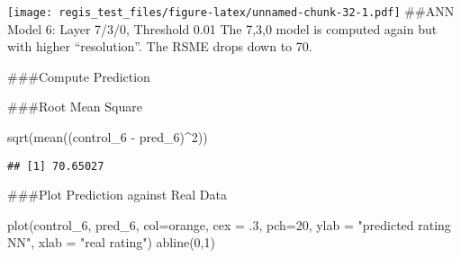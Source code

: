 \documentclass[
]{article}
\newenvironment{Shaded}{\begin{snugshade}}{\end{snugshade}}
\newcommand{\AttributeTok}[1]{\textcolor[rgb]{0.77,0.63,0.00}{#1}}
\newcommand{\DecValTok}[1]{\textcolor[rgb]{0.00,0.00,0.81}{#1}}
\newcommand{\FunctionTok}[1]{\textcolor[rgb]{0.00,0.00,0.00}{#1}}
\newcommand{\NormalTok}[1]{#1}
\newcommand{\OtherTok}[1]{\textcolor[rgb]{0.56,0.35,0.01}{#1}}
\newcommand{\SpecialCharTok}[1]{\textcolor[rgb]{0.00,0.00,0.00}{#1}}
\newcommand{\StringTok}[1]{\textcolor[rgb]{0.31,0.60,0.02}{#1}}
\begin{document}
\texttt{[image: regis\_test\_files/figure-latex/unnamed-chunk-32-1.pdf]}
\#\#ANN Model 6: Layer 7/3/0, Threshold 0.01 The 7,3,0 model is computed
again but with higher ``resolution''. The RSME drops down to 70.

\#\#\#Compute Prediction

\begin{Shaded}
\end{Shaded}

\#\#\#Root Mean Square

\begin{Shaded}
\begin{Highlighting}[]
\FunctionTok{sqrt}\NormalTok{(}\FunctionTok{mean}\NormalTok{((control\_6 }\SpecialCharTok{{-}}\NormalTok{ pred\_6)}\SpecialCharTok{\^{}}\DecValTok{2}\NormalTok{))}
\end{Highlighting}
\end{Shaded}

\begin{verbatim}
## [1] 70.65027
\end{verbatim}

\#\#\#Plot Prediction against Real Data

\begin{Shaded}
\begin{Highlighting}[]
\FunctionTok{plot}\NormalTok{(control\_6, pred\_6, }\AttributeTok{col=}\StringTok{\textquotesingle{}orange\textquotesingle{}}\NormalTok{, }\AttributeTok{cex =}\NormalTok{ .}\DecValTok{3}\NormalTok{, }\AttributeTok{pch=}\DecValTok{20}\NormalTok{, }\AttributeTok{ylab =} \StringTok{"predicted rating NN"}\NormalTok{, }\AttributeTok{xlab =} \StringTok{"real rating"}\NormalTok{)}
\FunctionTok{abline}\NormalTok{(}\DecValTok{0}\NormalTok{,}\DecValTok{1}\NormalTok{)}
\end{Highlighting}
\end{Shaded}
\end{document}
